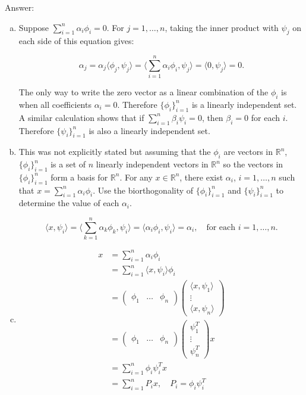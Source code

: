 \documentclass{article}
\begin{document}
Answer:

\begin{enumerate}[a.]

\item 

Suppose $\sum_{i= 1}^n \alpha_i \phi_i = 0$. For $j = 1,\dots , n$, taking the inner product with $\psi_j$ on each side of this equation gives:

$$
\alpha_j = \alpha_j \langle\phi_j , \psi_j \rangle
 = \bigg\langle \sum_{i = 1}^n \alpha_i \phi_i, \psi_j \bigg\rangle = \langle 0, \psi_j \rangle = 0.
$$

The only way to write the zero vector as a linear combination of the $\phi_i$ is when all coefficients $\alpha_i = 0$. Therefore $\{\phi_i \}_{i=1}^n$ is a linearly independent set. A similar calculation shows that if $\sum_{i=1}^n \beta_i \psi_i = 0$, then $\beta_i = 0$ for each $i$. Therefore $\{\psi_i \}_{i=1}^n$ is also a linearly independent set. 

\item This was not explicitly stated but assuming that the $\phi_i$ are vectors in $\mathbb{R}^n$, $\{\phi_i \}_{i=1}^n$ is a set of $n$ linearly independent vectors in $\mathbb{R}^n$ so the vectors in $\{\phi_i \}_{i=1}^n$ form a basis for $\mathbb{R}^n$. For any $x \in \mathbb{R}^n$, there exist $\alpha_i$, $i = 1,\dots , n$ such that $x = \sum_{i=1}^n \alpha_i \phi_i$. Use the biorthogonality of $\{\phi_i \}_{i=1}^n$ and $\{\psi_i \}_{i=1}^n$ to determine the value of each $\alpha_i$.

$$
\langle x , \psi_i \rangle = \bigg \langle \sum_{k=1}^n \alpha_k \phi_k , \psi_i \bigg \rangle = \langle \alpha_i \phi_i , \psi_i \rangle = \alpha_i, \quad \text{for each }i = 1,\dots , n. 
$$

\item 

\begin{align*}
x &= \sum_{i=1}^n \alpha_i \phi_i \\
&= \sum_{i=1}^n \langle x , \psi_i \rangle \phi_i \\
&= \begin{pmatrix}
\phi_1 & \dots & \phi_n
\end{pmatrix}
\begin{pmatrix}
\langle x , \psi_1 \rangle \\
\vdots \\
\langle x , \psi_n \rangle
\end{pmatrix} \\
&= \begin{pmatrix}
\phi_1 & \dots & \phi_n
\end{pmatrix}
\begin{pmatrix}
\psi_1^T \\
\vdots \\
\psi_n^T
\end{pmatrix} x\\
&= \sum_{i=1}^n \phi_i \psi_i^T x \\
&= \sum_{i=1}^n P_i x, \quad P_i = \phi_i \psi_i^T
\end{align*}


\end{enumerate}
\end{document}
